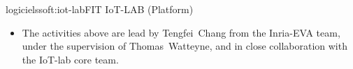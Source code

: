 \documentclass{ra2016}
\begin{document}
\begin{module}{logiciels}{soft:iot-lab}{FIT IoT-LAB (Platform)}
\begin{itemize}
    \begin{itemize}
        \item Allow commercial hardware to be plugged into the IoT-lab gateways.
        \item Allow multiple motes to be plugged into the same IoT-lab gateway.
        \item Use the IoT-lab for deploying and verifying the correct functioning of the OpenWSN implementation on all supported hardware board.
        \item Use the IoT-lab for deploying and verifying the correct functioning of the OpenWSN implementation at small/medium/large scale.
    \end{itemize}
    \item The activities above are lead by Tengfei~Chang from the Inria-EVA team, under the supervision of Thomas~Watteyne, and in close collaboration with the IoT-lab core team.
\end{itemize}

\end{module}

\end{document}
